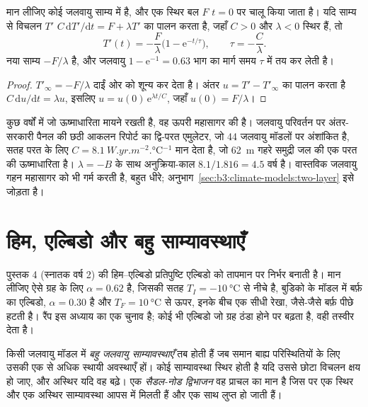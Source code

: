 \begin{theorem}[एक-बक्सा जलवायु की अनुक्रिया-काल]\label{thm:b3:climate-models:response}
मान लीजिए कोई जलवायु साम्य में है, और एक स्थिर बल $F$
$t = 0$ पर चालू किया जाता है। यदि साम्य से विचलन $T'$ $C\,\mathrm
dT'/\mathrm dt = F + \lambda T'$ का पालन करता है, जहाँ $C > 0$ और $\lambda < 0$ स्थिर हैं,
तो
\[
T'(t) = -\frac{F}{\lambda}\Big(1 - \mathrm e^{-t/\tau}\Big), \qquad
\tau = -\frac{C}{\lambda} .
\]
नया साम्य $-F/\lambda$ है, और जलवायु $1
- \mathrm e^{-1} = \num{0.63}$ भाग का मार्ग समय $\tau$ में तय कर लेती है।
\end{theorem}

\begin{proof}
$T'_\infty = -F/\lambda$ दाईं ओर को शून्य कर देता है। अंतर
$u = T' - T'_\infty$ का पालन करता है $C\,\mathrm du/\mathrm dt = \lambda u$, इसलिए $u =
u(0)\,\mathrm e^{\lambda t/C}$, जहाँ $u(0) = F/\lambda$।
\end{proof}

कुछ वर्षों में जो ऊष्माधारिता मायने रखती है, वह ऊपरी महासागर की है।
जलवायु परिवर्तन पर अंतर-सरकारी पैनल की छठी आकलन रिपोर्ट का द्वि-परत एमुलेटर,
जो 44 जलवायु मॉडलों पर अंशांकित है,
सतह परत के लिए $C = \qty{8.1}{W.yr.m^{-2}.\celsius^{-1}}$ मान देता है,
जो \qty{62}{m} गहरे समुद्री जल की एक परत की ऊष्माधारिता है। $\lambda = -B$ के साथ
अनुक्रिया-काल $8.1/1.816 = \num{4.5}\text{ वर्ष}$ है। वास्तविक जलवायु
गहन महासागर को भी गर्म करती है, बहुत धीरे; अनुभाग~\ref{sec:b3:climate-models:two-layer}
इसे जोड़ता है।

\section{हिम, एल्बिडो और बहु साम्यावस्थाएँ}\label{sec:b3:climate-models:multiple}

पुस्तक 4 (स्नातक वर्ष 2) की हिम--एल्बिडो प्रतिपुष्टि एल्बिडो को
तापमान पर निर्भर बनाती है। मान लीजिए ऐसे ग्रह के लिए $\alpha = 0.62$ है, जिसकी सतह
$T_I = \qty{-10}{\celsius}$ से नीचे है, बुडिको के मॉडल में बर्फ़ का एल्बिडो, $\alpha
= 0.30$ है और $T_F = \qty{+10}{\celsius}$ से ऊपर, इनके बीच एक सीधी रेखा, जैसे-जैसे बर्फ़ पीछे हटती है।
रैंप इस अध्याय का एक चुनाव है; कोई भी एल्बिडो जो
ग्रह ठंडा होने पर बढ़ता है, वही तस्वीर देता है।

\begin{definition}[बहु जलवायु साम्यावस्थाएँ; सैडल-नोड द्विभाजन]\label{def:b3:climate-models:multiple-equilibria}
किसी जलवायु मॉडल में \emph{बहु जलवायु साम्यावस्थाएँ} तब होती हैं
जब समान बाह्य परिस्थितियों के लिए उसकी एक से अधिक
स्थायी अवस्थाएँ हों। कोई साम्यावस्था स्थिर होती है यदि उससे छोटा विचलन क्षय हो जाए,
और अस्थिर यदि वह बढ़े। एक \emph{सैडल-नोड
द्विभाजन} वह प्राचल का मान है जिस पर एक स्थिर और एक अस्थिर साम्यावस्था
आपस में मिलती हैं और एक साथ लुप्त हो जाती हैं।
\end{definition}

